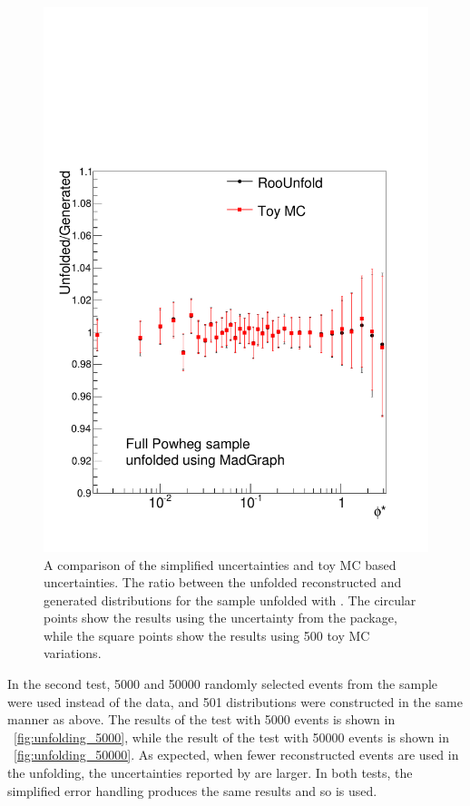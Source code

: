 \begin{figure}[!htbp]
    \centering
    \includegraphics[width=\SideBySidePlotWidth]{figures/BinM_MP_ALL.pdf}
    \caption{
        A comparison of the simplified \RooUnfold uncertainties and toy MC
        based uncertainties. The ratio between the unfolded reconstructed and
        generated \phistar distributions for the \POWHEG sample unfolded with
        \MADGRAPH. The circular points show the results using the uncertainty
        from the \RooUnfold package, while the square points show the results
        using \num{500} toy MC variations.
    }
    \label{fig:toy_unfolding_results}
\end{figure}

In the second test, \num{5000} and \num{50000} randomly selected events from
the \POWHEG sample were used instead of the data, and 501 distributions were
constructed in the same manner as above. The results of the test with
\num{5000} events is shown in \FIG~\ref{fig:unfolding_5000}, while the result
of the test with \num{50000} events is shown in \FIG~\ref{fig:unfolding_50000}.
As expected, when fewer reconstructed events are used in the unfolding, the
uncertainties reported by \RooUnfold are larger. In both tests, the simplified
error handling produces the same results and so is used.

